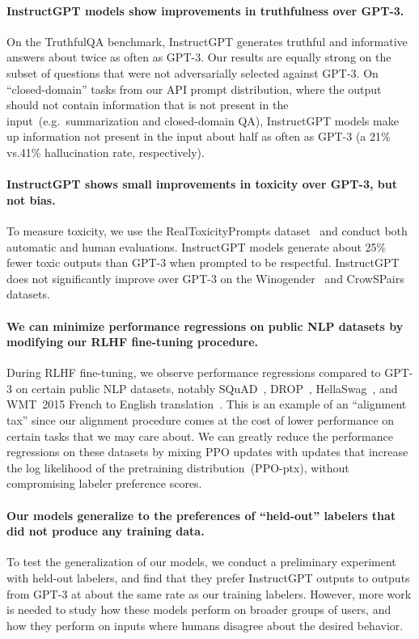 \documentclass{article}
\begin{document}
\paragraph{InstructGPT models show improvements in truthfulness over GPT-3.} On the TruthfulQA benchmark, InstructGPT generates truthful and informative answers about twice as often as GPT-3. Our results are equally strong on the subset of questions that were not adversarially selected against GPT-3. On ``closed-domain'' tasks from our API prompt distribution, where the output should not contain information that is not present in the input~(e.g.\ summarization and closed-domain QA), InstructGPT models make up information not present in the input about half as often as GPT-3 (a 21\% vs.\@ 41\% hallucination rate, respectively).

\paragraph{InstructGPT shows small improvements in toxicity over GPT-3, but not bias.} To measure toxicity, we use the RealToxicityPrompts dataset~\citep{gehman2020realtoxicityprompts} and conduct both automatic and human evaluations. InstructGPT models generate about 25\% fewer toxic outputs than GPT-3 when prompted to be respectful. InstructGPT does not significantly improve over GPT-3 on the Winogender~\citep{rudinger2018gender} and CrowSPairs~\citep{nangia2020crows} datasets.    

\paragraph{We can minimize performance regressions on public NLP datasets by modifying our RLHF fine-tuning procedure.} During RLHF fine-tuning, we observe performance regressions compared to GPT-3 on certain public NLP datasets, notably SQuAD~\citep{rajpurkar2018know}, DROP~\citep{dua2019drop}, HellaSwag~\citep{zellers2019hellaswag}, and WMT~2015 French to English translation~\citep{bojar-etal-2015-findings}. This is an example of an ``alignment tax'' since our alignment procedure comes at the cost of lower performance on certain tasks that we may care about. We can greatly reduce the performance regressions on these datasets by mixing PPO updates with updates that increase the log likelihood of the pretraining distribution~(PPO-ptx), without compromising labeler preference scores.

\paragraph{Our models generalize to the preferences of ``held-out'' labelers that did not produce any training data.} To test the generalization of our models, we conduct a preliminary experiment with held-out labelers, and find that they prefer InstructGPT outputs to outputs from GPT-3 at about the same rate as our training labelers. However, more work is needed to study how these models perform on broader groups of users, and how they perform on inputs where humans disagree about the desired behavior.
\end{document}
